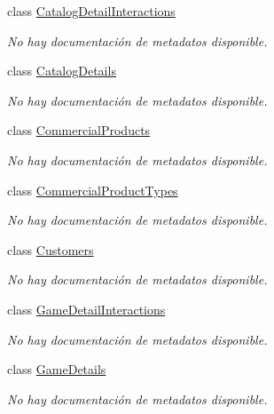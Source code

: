 \begin{DoxyCompactItemize}
class \hyperlink{class_microsoft_1_1_samples_1_1_kinect_1_1_basic_interactions_1_1_catalog_detail_interactions}{Catalog\-Detail\-Interactions}
\begin{DoxyCompactList}\small\item\em No hay documentación de metadatos disponible. \end{DoxyCompactList}\item 
class \hyperlink{class_microsoft_1_1_samples_1_1_kinect_1_1_basic_interactions_1_1_catalog_details}{Catalog\-Details}
\begin{DoxyCompactList}\small\item\em No hay documentación de metadatos disponible. \end{DoxyCompactList}\item 
class \hyperlink{class_microsoft_1_1_samples_1_1_kinect_1_1_basic_interactions_1_1_commercial_products}{Commercial\-Products}
\begin{DoxyCompactList}\small\item\em No hay documentación de metadatos disponible. \end{DoxyCompactList}\item 
class \hyperlink{class_microsoft_1_1_samples_1_1_kinect_1_1_basic_interactions_1_1_commercial_product_types}{Commercial\-Product\-Types}
\begin{DoxyCompactList}\small\item\em No hay documentación de metadatos disponible. \end{DoxyCompactList}\item 
class \hyperlink{class_microsoft_1_1_samples_1_1_kinect_1_1_basic_interactions_1_1_customers}{Customers}
\begin{DoxyCompactList}\small\item\em No hay documentación de metadatos disponible. \end{DoxyCompactList}\item 
class \hyperlink{class_microsoft_1_1_samples_1_1_kinect_1_1_basic_interactions_1_1_game_detail_interactions}{Game\-Detail\-Interactions}
\begin{DoxyCompactList}\small\item\em No hay documentación de metadatos disponible. \end{DoxyCompactList}\item 
class \hyperlink{class_microsoft_1_1_samples_1_1_kinect_1_1_basic_interactions_1_1_game_details}{Game\-Details}
\begin{DoxyCompactList}\small\item\em No hay documentación de metadatos disponible. \end{DoxyCompactList}\item 

\end{DoxyCompactItemize}
